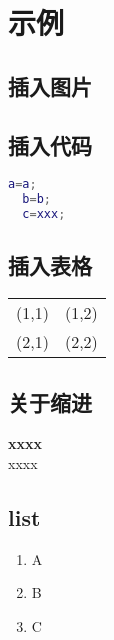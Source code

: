 
\section{示例}

\subsection{插入图片}

\subsection{插入代码}
\begin{lstlisting}[language=matlab]
  a=a;
  b=b;
  c=xxx;
\end{lstlisting}

\subsection{插入表格}
\begin{tabular}{cc}%
(1,1)&(1,2)\\%
(2,1)&(2,2)\\%
\end{tabular}

\subsection{关于缩进}
\indent \textbf{xxxx}\\
\noindent xxxx

\subsection{list}
\begin{enumerate}
	\item A
	\item B
	\item C
\end{enumerate}

